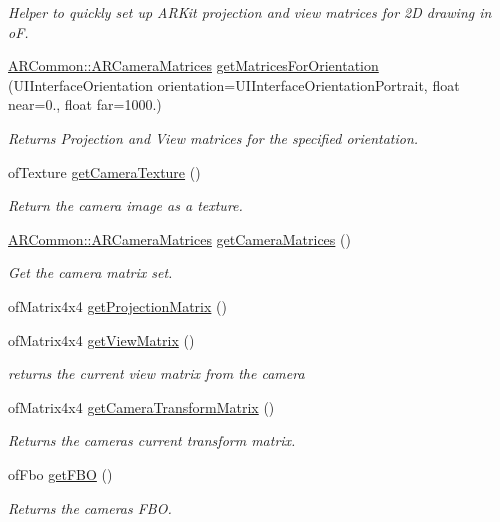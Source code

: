 \begin{DoxyCompactItemize}
\begin{DoxyCompactList}\small\item\em Helper to quickly set up A\+R\+Kit projection and view matrices for 2D drawing in oF. \end{DoxyCompactList}\item 
\mbox{\hyperlink{struct_a_r_common_1_1_a_r_camera_matrices}{A\+R\+Common\+::\+A\+R\+Camera\+Matrices}} \mbox{\hyperlink{class_a_r_processor_abcd684d805e880aed72c2eb56a65978f}{get\+Matrices\+For\+Orientation}} (U\+I\+Interface\+Orientation orientation=U\+I\+Interface\+Orientation\+Portrait, float near=0., float far=1000.)
\begin{DoxyCompactList}\small\item\em Returns Projection and View matrices for the specified orientation. \end{DoxyCompactList}\item 
of\+Texture \mbox{\hyperlink{class_a_r_processor_a5eb8045000bc6e0ad3d41d7bbf832047}{get\+Camera\+Texture}} ()
\begin{DoxyCompactList}\small\item\em Return the camera image as a texture. \end{DoxyCompactList}\item 
\mbox{\hyperlink{struct_a_r_common_1_1_a_r_camera_matrices}{A\+R\+Common\+::\+A\+R\+Camera\+Matrices}} \mbox{\hyperlink{class_a_r_processor_a82a9b334360ebccd844e7cf5584eff8b}{get\+Camera\+Matrices}} ()
\begin{DoxyCompactList}\small\item\em Get the camera matrix set. \end{DoxyCompactList}\item 
of\+Matrix4x4 \mbox{\hyperlink{class_a_r_processor_a0f7cf764c73a8fc3964be088156766ea}{get\+Projection\+Matrix}} ()
\item 
of\+Matrix4x4 \mbox{\hyperlink{class_a_r_processor_a2e1d4cde9029bad28ac797c94e73096a}{get\+View\+Matrix}} ()
\begin{DoxyCompactList}\small\item\em returns the current view matrix from the camera \end{DoxyCompactList}\item 
of\+Matrix4x4 \mbox{\hyperlink{class_a_r_processor_aea093b6d054daa0c75de6f7a492a19ff}{get\+Camera\+Transform\+Matrix}} ()
\begin{DoxyCompactList}\small\item\em Returns the camera\textquotesingle{}s current transform matrix. \end{DoxyCompactList}\item 
of\+Fbo \mbox{\hyperlink{class_a_r_processor_a8436dc786e91fb933879d90a4ab396d5}{get\+F\+BO}} ()
\begin{DoxyCompactList}\small\item\em Returns the camera\textquotesingle{}s F\+BO. \end{DoxyCompactList}\end{DoxyCompactItemize}
